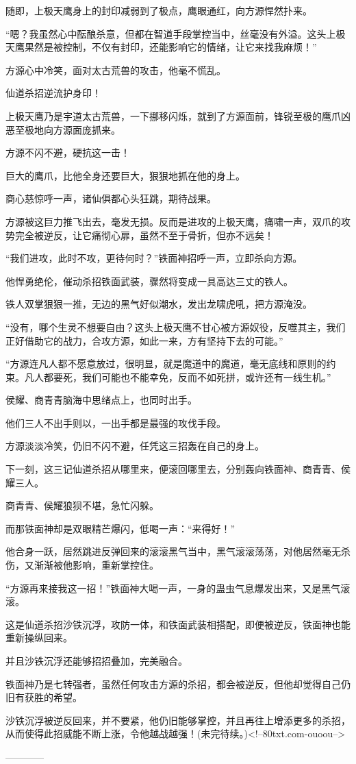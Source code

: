 \begin{this_body}
随即，上极天鹰身上的封印减弱到了极点，鹰眼通红，向方源悍然扑来。

“嗯？我虽然心中酝酿杀意，但都在智道手段掌控当中，丝毫没有外溢。这头上极天鹰果然是被控制，不仅有封印，还能影响它的情绪，让它来找我麻烦！”

方源心中冷笑，面对太古荒兽的攻击，他毫不慌乱。

仙道杀招逆流护身印！

上极天鹰乃是宇道太古荒兽，一下挪移闪烁，就到了方源面前，锋锐至极的鹰爪凶恶至极地向方源面庞抓来。

方源不闪不避，硬抗这一击！

巨大的鹰爪，比他全身还要巨大，狠狠地抓在他的身上。

商心慈惊呼一声，诸仙俱都心头狂跳，期待战果。

方源被这巨力推飞出去，毫发无损。反而是进攻的上极天鹰，痛啸一声，双爪的攻势完全被逆反，让它痛彻心扉，虽然不至于骨折，但亦不远矣！

“我们进攻，此时不攻，更待何时？”铁面神招呼一声，立即杀向方源。

他悍勇绝伦，催动杀招铁面武装，骤然将变成一具高达三丈的铁人。

铁人双掌狠狠一推，无边的黑气好似潮水，发出龙啸虎吼，把方源淹没。

“没有，哪个生灵不想要自由？这头上极天鹰不甘心被方源奴役，反噬其主，我们正好借助它的战力，合攻方源，如此一来，方有坚持下去的可能。”

“方源连凡人都不愿意放过，很明显，就是魔道中的魔道，毫无底线和原则的约束。凡人都要死，我们可能也不能幸免，反而不如死拼，或许还有一线生机。”

侯耀、商青青脑海中思绪点上，也同时出手。

他们三人不出手则以，一出手都是最强的攻伐手段。

方源淡淡冷笑，仍旧不闪不避，任凭这三招轰在自己的身上。

下一刻，这三记仙道杀招从哪里来，便滚回哪里去，分别轰向铁面神、商青青、侯耀三人。

商青青、侯耀狼狈不堪，急忙闪躲。

而那铁面神却是双眼精芒爆闪，低喝一声：“来得好！”

他合身一跃，居然跳进反弹回来的滚滚黑气当中，黑气滚滚荡荡，对他居然毫无杀伤，又渐渐被他影响，重新掌控住。

“方源再来接我这一招！”铁面神大喝一声，一身的蛊虫气息爆发出来，又是黑气滚滚。

这是仙道杀招沙铁沉浮，攻防一体，和铁面武装相搭配，即便被逆反，铁面神也能重新操纵回来。

并且沙铁沉浮还能够招招叠加，完美融合。

铁面神乃是七转强者，虽然任何攻击方源的杀招，都会被逆反，但他却觉得自己仍旧有获胜的希望。

沙铁沉浮被逆反回来，并不要紧，他仍旧能够掌控，并且再往上增添更多的杀招，从而使得此招威能不断上涨，令他越战越强！(未完待续。)<!--80txt.com-ouoou-->

------------

\end{this_body}

